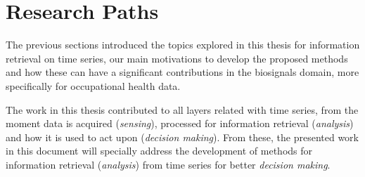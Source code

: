 
\section{Research Paths}

The previous sections introduced the topics explored in this thesis for information retrieval on time series, our main motivations to develop the proposed methods and how these can have a significant contributions in the biosignals domain, more specifically for occupational health data.
\par
The work in this thesis contributed to all layers related with time series, from the moment data is acquired (\textit{sensing}), processed for information retrieval (\textit{analysis}) and how it is used to act upon (\textit{decision making}). From these, the presented work in this document will specially address the development of methods for information retrieval (\textit{analysis}) from time series for better \textit{decision making}.

